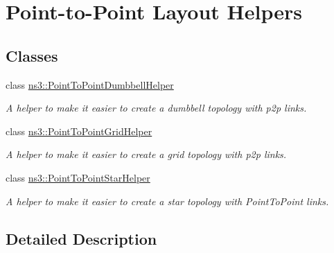 \hypertarget{group__point-to-point-layout}{}\section{Point-\/to-\/\+Point Layout Helpers}
\label{group__point-to-point-layout}
\subsection*{Classes}
\begin{DoxyCompactItemize}
\item 
class \hyperlink{classns3_1_1PointToPointDumbbellHelper}{ns3\+::\+Point\+To\+Point\+Dumbbell\+Helper}
\begin{DoxyCompactList}\small\item\em A helper to make it easier to create a dumbbell topology with p2p links. \end{DoxyCompactList}\item 
class \hyperlink{classns3_1_1PointToPointGridHelper}{ns3\+::\+Point\+To\+Point\+Grid\+Helper}
\begin{DoxyCompactList}\small\item\em A helper to make it easier to create a grid topology with p2p links. \end{DoxyCompactList}\item 
class \hyperlink{classns3_1_1PointToPointStarHelper}{ns3\+::\+Point\+To\+Point\+Star\+Helper}
\begin{DoxyCompactList}\small\item\em A helper to make it easier to create a star topology with Point\+To\+Point links. \end{DoxyCompactList}\end{DoxyCompactItemize}


\subsection{Detailed Description}
